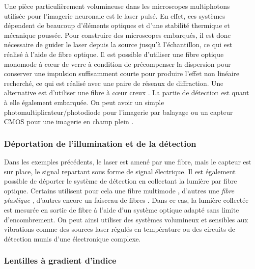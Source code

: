 Une pièce particulièrement volumineuse dans les microscopes multiphotons utilisée pour l'imagerie neuronale est le laser pulsé. En effet, ces systèmes dépendent de beaucoup d'éléments optiques et d'une stabilité thermique et mécanique poussée. Pour construire des microscopes embarqués, il est donc nécessaire de guider le laser depuis la source jusqu'à l'échantillon, ce qui est réalisé à l'aide de fibre optique. Il est possible d'utiliser une fibre optique monomode à cœur de verre \cite{helmchen_miniature_2001} \cite{sawinski_visually_2009} \cite{zong_fast_2017} à condition de précompenser la dispersion pour conserver une impulsion suffisamment courte pour produire l'effet non linéaire recherché, ce qui est réalisé avec une paire de réseaux de diffraction. Une alternative est d'utiliser une fibre à cœur creux \cite{tai_two-photon_2004} \cite{choi_improving_2014} \cite{piyawattanametha_vivo_2009} \cite{klioutchnikov_three-photon_2020}.
La partie de détection est quant à elle également embarquée. On peut avoir un simple photomultiplicateur/photodiode pour l'imagerie par balayage \cite{helmchen_miniature_2001} ou un capteur CMOS pour une imagerie en champ plein \cite{scott_imaging_2018}.

\subsubsection{Déportation de l'illumination et de la détection}

Dans les exemples précédents, le laser est amené par une fibre, mais le capteur est sur place, le signal repartant sous forme de signal électrique. Il est également possible de déporter le système de détection en collectant la lumière par fibre optique. Certains utilisent pour cela une fibre multimode \cite{piyawattanametha_vivo_2009} \cite{sawinski_visually_2009}, d'autres une \emph{fibre plastique} \cite{klioutchnikov_three-photon_2020}, d'autres encore un faisceau de fibres \cite{zong_fast_2017}. Dans ce cas, la lumière collectée est mesurée en sortie de fibre à l'aide d'un système optique adapté sans limite d'encombrement. On peut ainsi utiliser des systèmes volumineux et sensibles aux vibrations comme des sources laser régulés en température ou des circuits de détection munis d'une électronique complexe.

\subsubsection{Lentilles à gradient d'indice}

